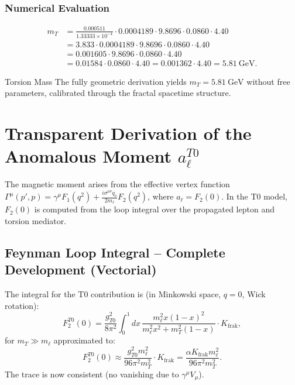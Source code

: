 \documentclass[12pt,a4paper]{article}
\begin{document}
	\subsubsection{Numerical Evaluation}
	\begin{align*}
		m_T &= \frac{0.000511}{1.33333\times 10^{-4}} \cdot 0.0004189 \cdot 9.8696 \cdot 0.0860 \cdot 4.40 \\
		&= 3.833 \cdot 0.0004189 \cdot 9.8696 \cdot 0.0860 \cdot 4.40 \\
		&= 0.001605 \cdot 9.8696 \cdot 0.0860 \cdot 4.40 \\
		&= 0.01584 \cdot 0.0860 \cdot 4.40 = 0.001362 \cdot 4.40 = 5.81\ \text{GeV}.
	\end{align*}
	
	\begin{result}{Torsion Mass}
		The fully geometric derivation yields $m_T = \SI{5.81}{\giga\electronvolt}$ without free parameters, calibrated through the fractal spacetime structure.
	\end{result}
	
	\section{Transparent Derivation of the Anomalous Moment $a_\ell^{T0}$}
	The magnetic moment arises from the effective vertex function $\Gamma^\mu(p',p) = \gamma^\mu F_1(q^2) + \frac{i \sigma^{\mu\nu} q_\nu}{2 m_\ell} F_2(q^2)$, where $a_\ell = F_2(0)$. In the T0 model, $F_2(0)$ is computed from the loop integral over the propagated lepton and torsion mediator.
	
	\subsection{Feynman Loop Integral -- Complete Development (Vectorial)}
	The integral for the T0 contribution is (in Minkowski space, $q=0$, Wick rotation):
	\begin{equation}
		F_2^{T0}(0) = \frac{g_{T0}^2}{8\pi^2} \int_0^1 dx \, \frac{m_\ell^2 x (1-x)^2}{m_\ell^2 x^2 + m_T^2 (1-x)} \cdot K_{\text{frak}},
	\end{equation}
	for $m_T \gg m_\ell$ approximated to:
	\begin{equation}
		F_2^{T0}(0) \approx \frac{g_{T0}^2 m_\ell^2}{96 \pi^2 m_T^2} \cdot K_{\text{frak}} = \frac{\alpha K_{\text{frak}} m_\ell^2}{96 \pi^2 m_T^2}.
	\end{equation}
	The trace is now consistent (no vanishing due to $\gamma^\mu V_\mu$).
	
\end{document}
